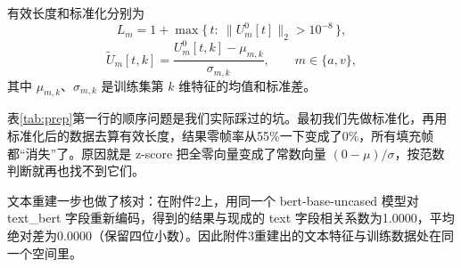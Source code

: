 有效长度和标准化分别为
\begin{equation}\label{eq:validlen}
L_m=1+\max\big\{\,t:\ \|U_m^0[t]\|_2>10^{-8}\,\big\},
\end{equation}
\begin{equation}\label{eq:zscore}
\tilde U_m[t,k]=\frac{U_m^0[t,k]-\mu_{m,k}}{\sigma_{m,k}},\qquad m\in\{a,v\},
\end{equation}
其中 $\mu_{m,k}$、$\sigma_{m,k}$ 是训练集第 $k$ 维特征的均值和标准差。

表\ref{tab:prep}第一行的顺序问题是我们实际踩过的坑。最初我们先做标准化，再用标准化后的数据去算有效长度，结果零帧率从55\%一下变成了0\%，所有填充帧都“消失”了。原因就是 z-score 把全零向量变成了常数向量 $(0-\mu)/\sigma$，按范数判断就再也找不到它们。

文本重建一步也做了核对：在附件2上，用同一个 bert-base-uncased 模型对 text\_bert 字段重新编码，得到的结果与现成的 text 字段相关系数为1.0000，平均绝对差为0.0000（保留四位小数）。因此附件3重建出的文本特征与训练数据处在同一个空间里。
